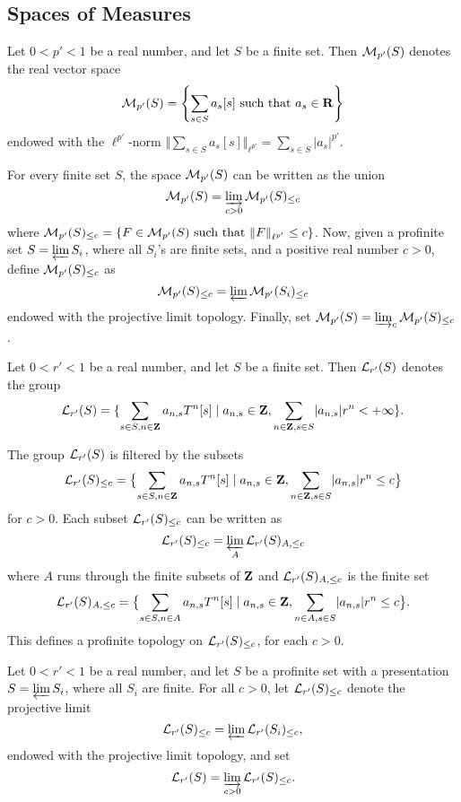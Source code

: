 \subsection{Spaces of Measures}

\begin{definition}
  \label{real-measures}
  \leanok
  Let $0 < p' < 1$ be a real number, and let $S$ be a finite set.
  Then $\mathcal M_{p'}(S)$ denotes the real vector space
  \[
	  \mathcal M_{p'}(S) = \left\{\sum_{s\in S}a_{s}[s] \text{ such that } a_{s}\in \mathbf{R}\right\}
  \]
	endowed with the $\ell^{p'}$-norm $\Vert \sum_{s\in S}a_s[s]\Vert_{\ell^{p'}}=\sum_{s\in S}\lvert a_s\rvert ^{p'}$.

  For every finite set $S$, the space $\mathcal M_{p'}(S)$ can be written as the union
  \[
    \mathcal M_{p'}(S) = \varinjlim_{c>0}\mathcal M_{p'}(S)_{\leq c}
  \]
  where $\mathcal M_{p'}(S)_{\leq c} = \left\{F \in \mathcal M_{p'}(S) \text{ such that } \Vert F \Vert_{\ell^{p'}}\leq c\right\}$.
  Now, given a profinite set $S=\varprojlim S_i$, where all $S_i$'s are finite sets, and a positive real number $c>0$, define $\mathcal M_{p'}(S)_{\leq c}$ as
  \[
    \mathcal M_{p'}(S)_{\leq c}=\varprojlim \mathcal M_{p'}(S_i)_{\leq c}
  \]
  endowed with the projective limit topology.
  Finally, set $\mathcal M_{p'}(S)=\varinjlim_{c}\mathcal M_{p'}(S)_{\leq c}$.
\end{definition}

\begin{definition}
  \label{laurent-measures-fin}
  \leanok
  Let $0 < r' < 1$ be a real number, and let $S$ be a finite set. Then $\mathcal L_{r'}(S)$ denotes the group
\[
	\mathcal L_{r'}(S)=\{\sum_{s\in S,n\in \mathbf{Z}}a_{n,s}T^n[s] \mid a_{n,s}\in \mathbf{Z}, \sum_{n\in\mathbf{Z}, s\in S}\lvert a_{n,s}\rvert r^n
< + \infty\}.
\]
\end{definition}

The group $\mathcal L_{r'}(S)$ is filtered by the subsets
\[
	\mathcal L_{r'}(S)_{\leq c}=\bigl\{\sum_{s\in S,n\in \mathbf{Z}}a_{n,s}T^n[s] \mid a_{n,s}\in \mathbf{Z}, \sum_{n\in\mathbf{Z}, s\in S}\lvert a_{n,s}\rvert r^n
\leq c\bigr\}
\]
for $c> 0$. Each subset $\mathcal L_{r'}(S)_{\leq c}$ can be written as
\[
\mathcal L_{r'}(S)_{\leq c}=\varprojlim_{A}\mathcal L_{r'}(S)_{A,\leq c}
\]
where $A$ runs through the finite subsets of $\mathbf{Z}$ and $\mathcal L_{r'}(S)_{A,\leq c}$ is the finite set
\[
	\mathcal L_{r'}(S)_{A,\leq c}=\bigl\{\sum_{s\in S,n\in A}a_{n,s}T^n[s] \mid a_{n,s}\in \mathbf{Z}, \sum_{n\in A, s\in S}\lvert a_{n,s}\rvert r^n\leq c\bigr\}.
\]
This defines a profinite topology on $\mathcal L_{r'}(S)_{\leq c}$, for each $c>0$.

\begin{definition}
  \label{laurent-measures}
  \leanok
  Let $0 < r' < 1$ be a real number, and let $S$ be a profinite set with a presentation $S=\varprojlim S_i$, where all $S_i$ are finite. For all $c>0$, let $\mathcal L_{r'}(S)_{\leq c}$ denote the projective limit
  \[
  \mathcal L_{r'}(S)_{\leq c}=\varprojlim\mathcal L_{r'}(S_i)_{\leq c},
  \]
  endowed with the projective limit topology, and set
  \[
  \mathcal L_{r'}(S)=\varinjlim_{c > 0}\mathcal L_{r'}(S)_{\leq c}.
  \]
\end{definition}

